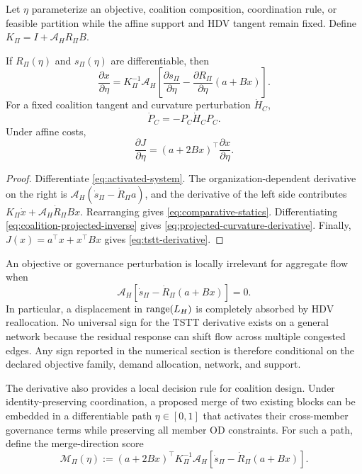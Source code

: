 Let $\eta$ parameterize an objective, coalition composition, coordination rule, or feasible partition while the affine support and HDV tangent remain fixed. Define $K_\Pi=I+\mathcal A_HR_\Pi B$.

\begin{proposition}\label{prop:comparative-statics}
If $R_\Pi(\eta)$ and $s_\Pi(\eta)$ are differentiable, then
\begin{equation}\label{eq:comparative-statics}
 \frac{\partial x}{\partial\eta}
 =K_\Pi^{-1}\mathcal A_H
 \left[
 \frac{\partial s_\Pi}{\partial\eta}
 -\frac{\partial R_\Pi}{\partial\eta}(a+Bx)
 \right].
\end{equation}
For a fixed coalition tangent and curvature perturbation $\dot H_C$,
\begin{equation}\label{eq:projected-curvature-derivative}
 \dot P_C=-P_C\dot H_CP_C.
\end{equation}
Under affine costs,
\begin{equation}\label{eq:tstt-derivative}
 \frac{\partial J}{\partial\eta}=(a+2Bx)^\top\frac{\partial x}{\partial\eta}.
\end{equation}
\end{proposition}

\begin{proof}
Differentiate \eqref{eq:activated-system}. The organization-dependent derivative on the right is $\mathcal A_H(\dot s_\Pi-\dot R_\Pi a)$, and the derivative of the left side contributes $K_\Pi\dot x+\mathcal A_H\dot R_\Pi Bx$. Rearranging gives \eqref{eq:comparative-statics}. Differentiating \eqref{eq:coalition-projected-inverse} gives \eqref{eq:projected-curvature-derivative}. Finally, $J(x)=a^\top x+x^\top Bx$ gives \eqref{eq:tstt-derivative}.
\end{proof}

An objective or governance perturbation is locally irrelevant for aggregate flow when
\[
 \mathcal A_H\left[\dot s_\Pi-\dot R_\Pi(a+Bx)\right]=0.
\]
In particular, a displacement in $\operatorname{range}(L_H)$ is completely absorbed by HDV reallocation. No universal sign for the TSTT derivative exists on a general network because the residual response can shift flow across multiple congested edges. Any sign reported in the numerical section is therefore conditional on the declared objective family, demand allocation, network, and support.

The derivative also provides a local decision rule for coalition design. Under
identity-preserving coordination, a proposed merge of two existing blocks can
be embedded in a differentiable path $\eta\in[0,1]$ that activates their
cross-member governance terms while preserving all member OD constraints. For
such a path, define the merge-direction score
\begin{equation}\label{eq:merge-score}
 \mathcal M_\Pi(\eta)
 :=(a+2Bx)^{\top}K_\Pi^{-1}\mathcal A_H
 \left[\dot s_\Pi-\dot R_\Pi(a+Bx)\right].
\end{equation}

